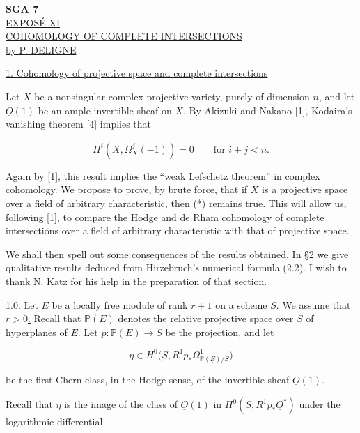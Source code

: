 \clearpage
\begin{center}
{\large\textbf{SGA 7}}\\[1.5em]
{\Large\underline{EXPOSÉ XI}}\\[2.5em]
{\Large\underline{COHOMOLOGY OF COMPLETE INTERSECTIONS}}\\[1.5em]
{\large\underline{by P. DELIGNE}}
\end{center}

\bigskip
\noindent\underline{1. Cohomology of projective space and complete
intersections}

Let $X$ be a nonsingular complex projective variety, purely of dimension $n$,
and let $\underline O(1)$ be an ample invertible sheaf on $X$.  By Akizuki and
Nakano [1], Kodaira's vanishing theorem [4] implies that

\begin{equation}\tag{*}
H^i(X,\Omega_X^j(-1))=0\qquad\text{for }i+j<n.
\end{equation}

Again by [1], this result implies the ``weak Lefschetz theorem'' in complex
cohomology.  We propose to prove, by brute force, that if $X$ is a projective
space over a field of arbitrary characteristic, then (*) remains true.  This
will allow us, following [1], to compare the Hodge and de Rham cohomology of
complete intersections over a field of arbitrary characteristic with that of
projective space.

We shall then spell out some consequences of the results obtained.  In §2 we
give qualitative results deduced from Hirzebruch's numerical formula (2.2).  I
wish to thank N. Katz for his help in the preparation of that section.

1.0. Let $\underline E$ be a locally free module of rank $r+1$ on a scheme
$S$.  \underline{We assume that $r>0$.}  Recall that
$\mathbb P(\underline E)$ denotes the relative projective space over $S$ of
hyperplanes of $\underline E$.  Let $p:\mathbb P(\underline E)\to S$ be the
projection, and let

\begin{equation*}
\eta\in H^0\bigl(S,R^1p_*\Omega^1_{\mathbb P(\underline E)/S}\bigr)
\end{equation*}

be the first Chern class, in the Hodge sense, of the invertible sheaf
$\underline O(1)$.


Recall that $\eta$ is the image of the class of $\underline O(1)$ in
$H^0(S,R^1p_*\underline O^*)$ under the logarithmic differential

